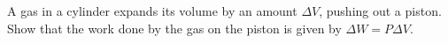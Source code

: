 A gas in a cylinder expands its volume by an amount $\Delta V$,
pushing out a piston.
Show that the work done by
the gas on the piston is given by  $\Delta W = P\Delta V$.
